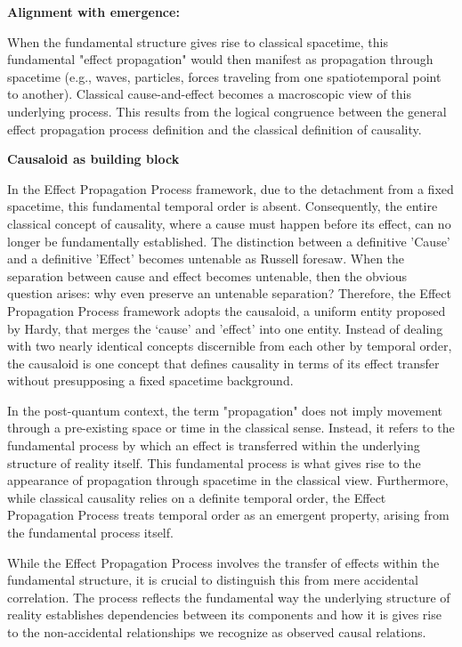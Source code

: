 \documentclass{article}
\begin{document}
\textbf{Alignment with emergence:}

When the fundamental structure gives rise to classical spacetime, this fundamental "effect propagation" would then manifest as propagation through spacetime (e.g., waves, particles, forces traveling from one spatiotemporal point to another). Classical cause-and-effect becomes a macroscopic view of this underlying process. This results from the logical congruence between the general effect propagation process definition and the classical definition of causality.

\textbf{Causaloid as building block}

In the Effect Propagation Process framework, due to the detachment from a fixed spacetime, this fundamental temporal order is absent. Consequently, the entire classical concept of causality, where a cause must happen before its effect, can no longer be fundamentally established. The distinction between a definitive 'Cause' and a definitive 'Effect' becomes untenable as Russell foresaw. When the separation between cause and effect becomes untenable, then the obvious question arises: why even preserve an untenable separation?
Therefore, the Effect Propagation Process framework adopts the causaloid, a uniform entity proposed by Hardy\cite{HardyDynamicCausalStructure}, that merges the ‘cause' and 'effect' into one entity. Instead of dealing with two nearly identical concepts discernible from each other by temporal order, the causaloid is one concept that defines causality in terms of its effect transfer without presupposing a fixed spacetime background.\newline

In the post-quantum context, the term "propagation" does not imply movement through a pre-existing space or time in the classical sense. Instead, it refers to the fundamental process by which an effect is transferred within the underlying structure of reality itself. This fundamental process is what gives rise to the appearance of propagation through spacetime in the classical view. Furthermore, while classical causality relies on a definite temporal order, the Effect Propagation Process treats temporal order as an emergent property, arising from the fundamental process itself.

While the Effect Propagation Process involves the transfer of effects within the fundamental structure, it is crucial to distinguish this from mere accidental correlation. The process reflects the fundamental way the underlying structure of reality establishes dependencies between its components and how it is gives rise to the non-accidental relationships we recognize as observed causal relations.
\end{document}
